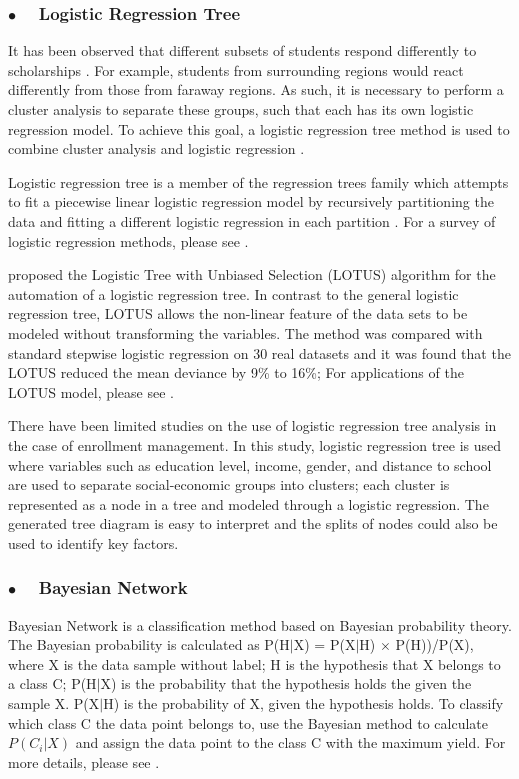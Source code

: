 \documentclass[12pt,english]{report}
\begin{document}
\subsubsection{$\bullet \quad$  Logistic Regression Tree}

It has been observed that different subsets of students respond differently to
scholarships \citep{Curs2002, Heller1999}. For example, students from
surrounding regions would react differently from those from faraway regions. As
such, it is necessary to perform a cluster analysis to separate these groups,
such that each has its own logistic regression model. To achieve this goal, a
logistic regression tree method is used to combine cluster analysis and
logistic regression \citep{Loh2011}.

Logistic regression tree is a member of the regression trees family which
attempts to fit a piecewise linear logistic regression model by recursively
partitioning the data and fitting a different logistic regression in each
partition \citep{lotus2}. For a survey of logistic regression methods, please
see \citep{harrell2013regression_book}.
    
\citet{lotus2} proposed the Logistic Tree with Unbiased Selection (LOTUS)
algorithm for the automation of a logistic regression tree. In contrast to the
general logistic regression tree, LOTUS allows the non-linear feature of the
data sets to be modeled without transforming the variables. The method was
compared with standard stepwise logistic regression on 30 real datasets and it
was found that the LOTUS reduced the mean deviance by 9\% to 16\%;  For
applications of the LOTUS model, please see \citep{lotus_app1,lotus_app2}.

There have been limited studies on the use of logistic regression tree analysis
in the case of enrollment management. In this study, logistic regression tree
is used where variables such as education level, income, gender, and distance
to school are used to separate social-economic groups into clusters; each
cluster is represented as a node in a tree and modeled through a logistic
regression. The generated tree diagram is easy to interpret and the splits of
nodes could also be used to identify key factors.

\subsubsection {$\bullet \quad$ Bayesian Network}
Bayesian Network is a classification method based on Bayesian probability
theory.
The Bayesian probability is calculated as P(H$|$X) = P(X$|$H)  $\times$
P(H))/P(X), where X is the data sample without label; H is the hypothesis that
X belongs to a class C; P(H$|$X) is the probability that the hypothesis holds
the given the sample X.
P(X$|$H) is the probability of X, given the hypothesis holds. 
To classify which class C the data point belongs to, use the Bayesian method to
calculate $P(C_i|X)$ and assign the data point to the class C with the maximum
yield.
For more details, please see \citep{Han2011}.
\end{document}
